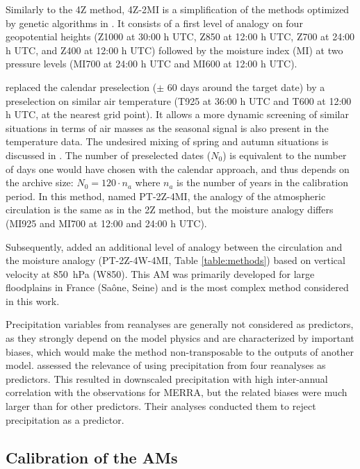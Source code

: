 \documentclass{ametsoc}
\begin{document}
Similarly to the 4Z method, 4Z-2MI is a simplification of the methods optimized by genetic algorithms in \citet{Horton2017b}. It consists of a first level of analogy on four geopotential heights (Z1000 at 30:00 h UTC, Z850 at 12:00 h UTC, Z700 at 24:00 h UTC, and Z400 at 12:00 h UTC) followed by the moisture index (MI) at two pressure levels (MI700 at 24:00 h UTC and MI600 at 12:00 h UTC).

\citet{BenDaoud2016} replaced the calendar preselection ($\pm$ 60 days around the target date) by a preselection on similar air temperature (T925 at 36:00 h UTC and T600 at 12:00 h UTC, at the nearest grid point). It allows a more dynamic screening of similar situations in terms of air masses as the seasonal signal is also present in the temperature data. The undesired mixing of spring and autumn situations is discussed in \citet{Caillouet2016}. The number of preselected dates ($N_{0}$) is equivalent to the number of days one would have chosen with the calendar approach, and thus depends on the archive size: $N_{0} = 120 \cdot n_{a}$ where $n_{a}$ is the number of years in the calibration period. In this method, named PT-2Z-4MI, the analogy of the atmospheric circulation is the same as in the 2Z method, but the moisture analogy differs (MI925 and MI700 at 12:00 and 24:00 h UTC).

Subsequently, \citet{BenDaoud2016} added an additional level of analogy between the circulation and the moisture analogy (PT-2Z-4W-4MI, Table \ref{table:methods}) based on vertical velocity at 850~hPa (W850). This AM was primarily developed for large floodplains in France (Sa\^{o}ne, Seine) and is the most complex method considered in this work. 

Precipitation variables from reanalyses are generally not considered as predictors, as they strongly depend on the model physics \citep{Rienecker2011} and are characterized by important biases, which would make the method non-transposable to the outputs of another model. \citet{Dayon2015} assessed the relevance of using precipitation from four reanalyses as predictors. This resulted in downscaled precipitation with high inter-annual correlation with the observations for MERRA, but the related biases were much larger than for other predictors. Their analyses conducted them to reject precipitation as a predictor.


\subsection{Calibration of the AMs}
\label{sec:calibration}
\end{document}
